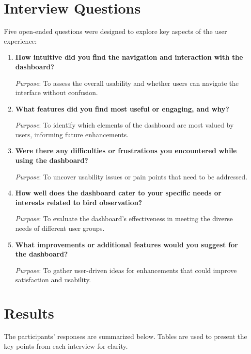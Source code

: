 \section{Interview Questions}

Five open-ended questions were designed to explore key aspects of the user experience:

\begin{enumerate}
    \item \textbf{How intuitive did you find the navigation and interaction with the dashboard?}

    \textit{Purpose}: To assess the overall usability and whether users can navigate the interface without confusion.

    \item \textbf{What features did you find most useful or engaging, and why?}

    \textit{Purpose}: To identify which elements of the dashboard are most valued by users, informing future enhancements.

    \item \textbf{Were there any difficulties or frustrations you encountered while using the dashboard?}

    \textit{Purpose}: To uncover usability issues or pain points that need to be addressed.

    \item \textbf{How well does the dashboard cater to your specific needs or interests related to bird observation?}

    \textit{Purpose}: To evaluate the dashboard's effectiveness in meeting the diverse needs of different user groups.

    \item \textbf{What improvements or additional features would you suggest for the dashboard?}

    \textit{Purpose}: To gather user-driven ideas for enhancements that could improve satisfaction and usability.
\end{enumerate}

\section{Results}

The participants' responses are summarized below. Tables are used to present the key points from each interview for clarity.

